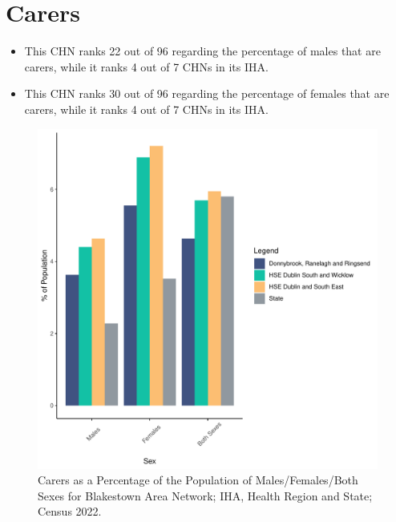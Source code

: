 \documentclass{article}
\begin{document}
\section{Carers}\label{sect:Carers}
\begin{itemize}
\item This CHN ranks  22 out of 96 regarding the percentage of males that are carers, while it ranks   4 out of 7 CHNs in its IHA.
\item This CHN ranks  30 out of 96 regarding the percentage of females that are carers, while it ranks   4 out of 7 CHNs in its IHA.
\end{itemize}
\begin{figure}[H]
	\centering
	\includegraphics[width = 150mm]{../figures/CareED.pdf}
	\caption{Carers as a Percentage of the Population of Males/Females/Both Sexes for Blakestown Area Network; IHA, Health Region and State; Census 2022.}
	\label{fig:2ae19629-1a6a-13a3-e055-000000000001}
	\end{figure}
\end{document}
